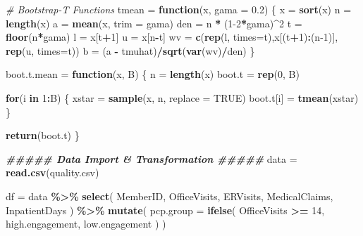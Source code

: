 \documentclass[
]{article}
\newenvironment{Shaded}{\begin{snugshade}}{\end{snugshade}}
\newcommand{\AttributeTok}[1]{\textcolor[rgb]{0.13,0.29,0.53}{#1}}
\newcommand{\CommentTok}[1]{\textcolor[rgb]{0.56,0.35,0.01}{\textit{#1}}}
\newcommand{\ConstantTok}[1]{\textcolor[rgb]{0.56,0.35,0.01}{#1}}
\newcommand{\ControlFlowTok}[1]{\textcolor[rgb]{0.13,0.29,0.53}{\textbf{#1}}}
\newcommand{\DecValTok}[1]{\textcolor[rgb]{0.00,0.00,0.81}{#1}}
\newcommand{\DocumentationTok}[1]{\textcolor[rgb]{0.56,0.35,0.01}{\textbf{\textit{#1}}}}
\newcommand{\FloatTok}[1]{\textcolor[rgb]{0.00,0.00,0.81}{#1}}
\newcommand{\FunctionTok}[1]{\textcolor[rgb]{0.13,0.29,0.53}{\textbf{#1}}}
\newcommand{\NormalTok}[1]{#1}
\newcommand{\OtherTok}[1]{\textcolor[rgb]{0.56,0.35,0.01}{#1}}
\newcommand{\SpecialCharTok}[1]{\textcolor[rgb]{0.81,0.36,0.00}{\textbf{#1}}}
\newcommand{\StringTok}[1]{\textcolor[rgb]{0.31,0.60,0.02}{#1}}
\begin{document}
\begin{Shaded}
\begin{Highlighting}[]
\CommentTok{\# Bootstrap{-}T Functions}
\NormalTok{tmean }\OtherTok{=} \ControlFlowTok{function}\NormalTok{(x, }\AttributeTok{gama =} \FloatTok{0.2}\NormalTok{) \{}
\NormalTok{    x }\OtherTok{=} \FunctionTok{sort}\NormalTok{(x)}
\NormalTok{    n }\OtherTok{=} \FunctionTok{length}\NormalTok{(x)}
\NormalTok{    a }\OtherTok{=} \FunctionTok{mean}\NormalTok{(x, }\AttributeTok{trim =}\NormalTok{ gama)}
\NormalTok{    den }\OtherTok{=}\NormalTok{ n }\SpecialCharTok{*}\NormalTok{ (}\DecValTok{1{-}2}\SpecialCharTok{*}\NormalTok{gama)}\SpecialCharTok{\^{}}\DecValTok{2}
\NormalTok{    t }\OtherTok{=} \FunctionTok{floor}\NormalTok{(n}\SpecialCharTok{*}\NormalTok{gama)}
\NormalTok{    l }\OtherTok{=}\NormalTok{ x[t}\SpecialCharTok{+}\DecValTok{1}\NormalTok{]}
\NormalTok{    u }\OtherTok{=}\NormalTok{ x[n}\SpecialCharTok{{-}}\NormalTok{t]}
\NormalTok{    wv }\OtherTok{=} \FunctionTok{c}\NormalTok{(}\FunctionTok{rep}\NormalTok{(l, }\AttributeTok{times=}\NormalTok{t),x[(t}\SpecialCharTok{+}\DecValTok{1}\NormalTok{)}\SpecialCharTok{:}\NormalTok{(n}\DecValTok{{-}1}\NormalTok{)], }\FunctionTok{rep}\NormalTok{(u, }\AttributeTok{times=}\NormalTok{t))}
\NormalTok{    b }\OtherTok{=}\NormalTok{ (a }\SpecialCharTok{{-}}\NormalTok{ tmuhat)}\SpecialCharTok{/}\FunctionTok{sqrt}\NormalTok{(}\FunctionTok{var}\NormalTok{(wv)}\SpecialCharTok{/}\NormalTok{den)}
\NormalTok{\}}

\NormalTok{boot.t.mean }\OtherTok{=} \ControlFlowTok{function}\NormalTok{(x, B) \{}
\NormalTok{    n }\OtherTok{=} \FunctionTok{length}\NormalTok{(x)}
\NormalTok{    boot.t }\OtherTok{=} \FunctionTok{rep}\NormalTok{(}\DecValTok{0}\NormalTok{, B)}

    \ControlFlowTok{for}\NormalTok{(i }\ControlFlowTok{in} \DecValTok{1}\SpecialCharTok{:}\NormalTok{B) \{}
\NormalTok{        xstar }\OtherTok{=} \FunctionTok{sample}\NormalTok{(x, n, }\AttributeTok{replace =} \ConstantTok{TRUE}\NormalTok{)}
\NormalTok{        boot.t[i] }\OtherTok{=} \FunctionTok{tmean}\NormalTok{(xstar)}
\NormalTok{    \}}

    \FunctionTok{return}\NormalTok{(boot.t)}
\NormalTok{\}}

\DocumentationTok{\#\#\#\#\# Data Import \& Transformation \#\#\#\#\#}
\NormalTok{data }\OtherTok{=} \FunctionTok{read.csv}\NormalTok{(}\StringTok{\textquotesingle{}quality.csv\textquotesingle{}}\NormalTok{)}

\NormalTok{df }\OtherTok{=}\NormalTok{ data }\SpecialCharTok{\%\textgreater{}\%}
    \FunctionTok{select}\NormalTok{(}
\NormalTok{        MemberID,}
\NormalTok{        OfficeVisits,}
\NormalTok{        ERVisits,}
\NormalTok{        MedicalClaims,}
\NormalTok{        InpatientDays}
\NormalTok{    ) }\SpecialCharTok{\%\textgreater{}\%}
    \FunctionTok{mutate}\NormalTok{(}
        \AttributeTok{pcp.group =} \FunctionTok{ifelse}\NormalTok{(}
\NormalTok{            OfficeVisits }\SpecialCharTok{\textgreater{}=} \DecValTok{14}\NormalTok{,}
            \StringTok{\textquotesingle{}high.engagement\textquotesingle{}}\NormalTok{,}
            \StringTok{\textquotesingle{}low.engagement\textquotesingle{}}
\NormalTok{        )}
\NormalTok{    )}


\end{Highlighting}
\end{Shaded}
\end{document}

